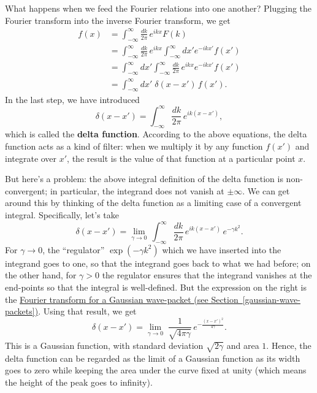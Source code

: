 \documentclass[10pt,a4paper]{article}
\begin{document}
What happens when we feed the Fourier relations into one another?
Plugging the Fourier transform into the inverse Fourier transform, we
get
\begin{align}
  f(x) &= \int_{-\infty}^\infty \frac{dk}{2\pi} \, e^{ikx} F(k) \\
  &= \int_{-\infty}^\infty \frac{dk}{2\pi} \, e^{ikx} \int_{-\infty}^\infty dx' e^{-ikx'} f(x')\\
  &= \int_{-\infty}^\infty dx' \int_{-\infty}^\infty \frac{dk}{2\pi} \, e^{ikx} e^{-ikx'} f(x')\\
  &= \int_{-\infty}^\infty  dx' \; \delta(x-x')\, f(x').
\end{align}
In the last step, we have introduced
\begin{equation}
  \delta(x-x') = \int_{-\infty}^\infty \frac{dk}{2\pi} \, e^{ik(x-x')},
\end{equation}
which is called the \textbf{delta function}. According to the above
equations, the delta function acts as a kind of filter: when we
multiply it by any function $f(x')$ and integrate over $x'$, the
result is the value of that function at a particular point $x$.

But here's a problem: the above integral definition of the delta
function is non-convergent; in particular, the integrand does not vanish
at $\pm \infty$. We can get around this by thinking of the delta
function as a limiting case of a convergent integral. Specifically,
let's take
\begin{equation}
  \delta(x-x') = \lim_{\gamma \rightarrow 0} \, \int_{-\infty}^\infty \frac{dk}{2\pi} \, e^{ik(x-x')} \, e^{-\gamma k^2}.
\end{equation}
For $\gamma \rightarrow 0$, the ``regulator'' $\exp(-\gamma k^2)$
which we have inserted into the integrand goes to one, so that the
integrand goes back to what we had before; on the other hand, for
$\gamma > 0$ the regulator ensures that the integrand vanishes at the
end-points so that the integral is well-defined. But the expression on
the right is the \hyperref[gaussian-wave-packets]{Fourier transform
  for a Gaussian wave-packet (see
  Section~\ref{gaussian-wave-packets})}. Using that result, we get
\begin{equation}
  \delta(x-x') = \lim_{\gamma \rightarrow 0} \; \frac{1}{\sqrt{4\pi\gamma}} \,
  e^{-\frac{(x-x')^2}{4\gamma}}.
\end{equation}
This is a Gaussian function, with standard deviation $\sqrt{2\gamma}$
and area $1$. Hence, the delta function can be regarded as the limit
of a Gaussian function as its width goes to zero while keeping the
area under the curve fixed at unity (which means the height of the
peak goes to infinity).
\end{document}

